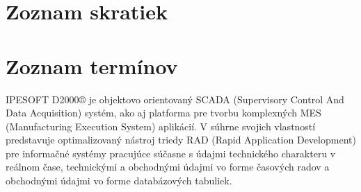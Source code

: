 \chapter*{Zoznam skratiek}
\begin{acronym}
\acro{}{}
\end{acronym}



\chapter*{Zoznam termínov}

IPESOFT D2000® je objektovo orientovaný SCADA (Supervisory Control And Data Acquisition) systém, ako aj platforma pre tvorbu komplexných MES (Manufacturing Execution System) aplikácií. V súhrne svojich vlastností predstavuje optimalizovaný nástroj triedy RAD (Rapid Application Development) pre informačné systémy pracujúce súčasne s údajmi technického charakteru v reálnom čase, technickými a obchodnými údajmi vo forme časových radov a obchodnými údajmi vo forme databázových tabuliek.




